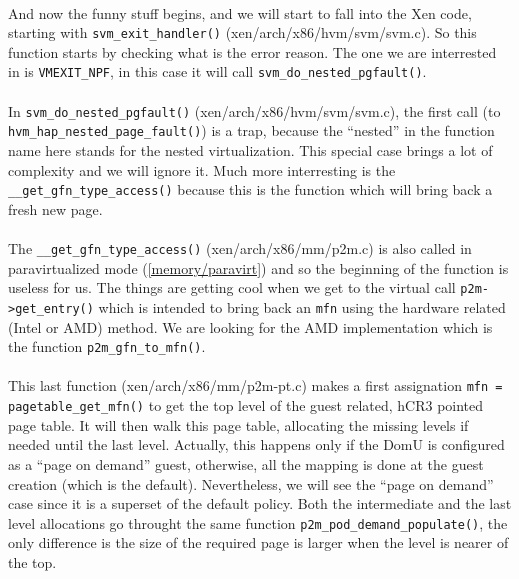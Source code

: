 \paragraph{}
And now the funny stuff begins, and we will start to fall into the Xen code,
starting with \verb!svm_exit_handler()!
(xen/arch/x86/hvm/svm/svm.c).
So this function starts by checking what is the error reason.
The one we are interrested in is \verb!VMEXIT_NPF!, in this case it
will call \verb!svm_do_nested_pgfault()!.

\paragraph{}
In \verb!svm_do_nested_pgfault()! (xen/arch/x86/hvm/svm/svm.c), the first call
(to \verb!hvm_hap_nested_page_fault()!) is a trap, because the ``nested'' in
the function name here stands for the nested virtualization.
This special case brings a lot of complexity and we will ignore it.
Much more interresting is the \verb!__get_gfn_type_access()! because this is
the function which will bring back a fresh new page.

\paragraph{}
The \verb!__get_gfn_type_access()! (xen/arch/x86/mm/p2m.c) is also called in
paravirtualized mode (\ref{memory/paravirt}) and so the beginning of the
function is useless for us.
The things are getting cool when we get to the virtual call
\verb!p2m->get_entry()! which is intended to bring back an \verb!mfn! using
the hardware related (Intel or AMD) method.
We are looking for the AMD implementation which is the function
\verb!p2m_gfn_to_mfn()!.

\paragraph{}
This last function (xen/arch/x86/mm/p2m-pt.c) makes a first assignation
\verb!mfn = pagetable_get_mfn()! to get the top level of the guest related,
hCR3 pointed page table.
It will then walk this page table, allocating the missing levels if needed
until the last level.
Actually, this happens only if the DomU is configured as a ``page on demand''
guest, otherwise, all the mapping is done at the guest creation (which is the
default).
Nevertheless, we will see the ``page on demand'' case since it is a superset of
the default policy.
Both the intermediate and the last level allocations go throught the same
function \verb!p2m_pod_demand_populate()!, the only difference is the size
of the required page is larger when the level is nearer of the top.

